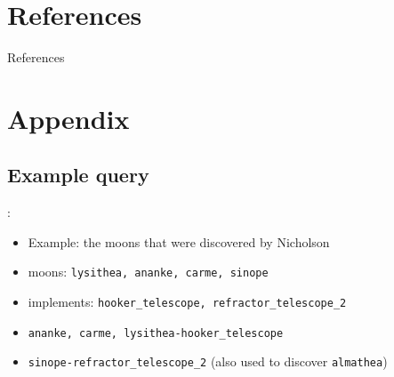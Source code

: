 \documentclass[logoontitle,tabu,supertabular,aspectratio=43]{preney-uwindsor-beamer}
\begin{document}


    \section*{References}
	\begin{frame}[allowframebreaks]{References}
	\printbibliography
	\end{frame}

    \section*{Appendix}
    \subsection{Example query}
    \begin{frame}{\insertsection: \insertsubsection}
        \begin{itemize}

            \item Example: the moons that were discovered by Nicholson
            \item moons: \texttt{lysithea, ananke, carme, sinope}
            \item implements: \texttt{hooker\_telescope, refractor\_telescope\_2}
            \item \texttt{ananke, carme, lysithea-hooker\_telescope}
            \item \texttt{sinope-refractor\_telescope\_2} (also used to discover \texttt{almathea})
        \end{itemize}
    \end{frame}
\end{document}
